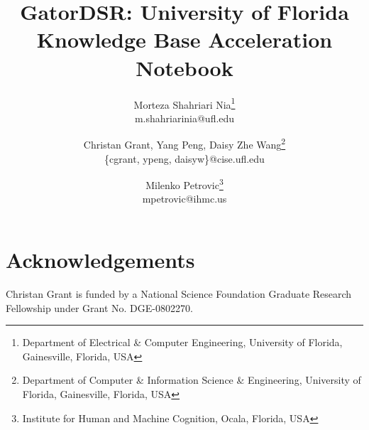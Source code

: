 \documentclass[10pt]{article}
\begin{document}
\title{GatorDSR: University of Florida Knowledge Base Acceleration Notebook}



\author {
  Morteza Shahriari Nia\footnote{ Department of Electrical \& Computer Engineering, University of Florida, Gainesville, Florida, USA}\\
       {m.shahriarinia@ufl.edu}
\and
  Christan Grant, Yang Peng, Daisy Zhe Wang\footnote{Department of Computer \& Information Science \& Engineering, University of Florida, Gainesville, Florida, USA}\\
       {\{cgrant, ypeng, daisyw\}@cise.ufl.edu}
\and
  Milenko Petrovic\footnote{Institute for Human and Machine Cognition, Ocala, Florida, USA}\\
       {mpetrovic@ihmc.us}
}

\maketitle
















\section*{Acknowledgements}
Christan Grant is funded by a National Science Foundation Graduate Research
Fellowship under Grant No. DGE-0802270. 

%
%



\end{document}

